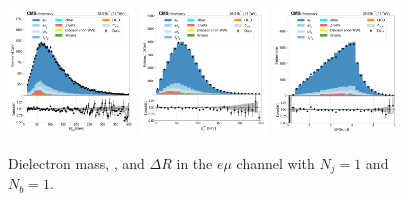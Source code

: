 \begin{figure}[htb!]
    \centering
    \includegraphics[width=0.3\textwidth]{chapters/Analysis/sectionPlots/figures/data_mc_overlays/emu_2016_cat_eq1_eq1_a_signal_linear_lepton_dilepton1_mass}
    \includegraphics[width=0.3\textwidth]{chapters/Analysis/sectionPlots/figures/data_mc_overlays/emu_2016_cat_eq1_eq1_a_signal_linear_lepton_dilepton1_pt}
    \includegraphics[width=0.3\textwidth]{chapters/Analysis/sectionPlots/figures/data_mc_overlays/emu_2016_cat_eq1_eq1_a_signal_linear_lepton_dilepton1_delta_r}
    \caption{Dielectron mass, \pt, and $\Delta R$ in the $e\mu$ channel
    with $N_{j} = 1$ and $N_{b} = 1$.}
    \label{fig:analysis:plots:emu_3_dilepton}
\end{figure}

